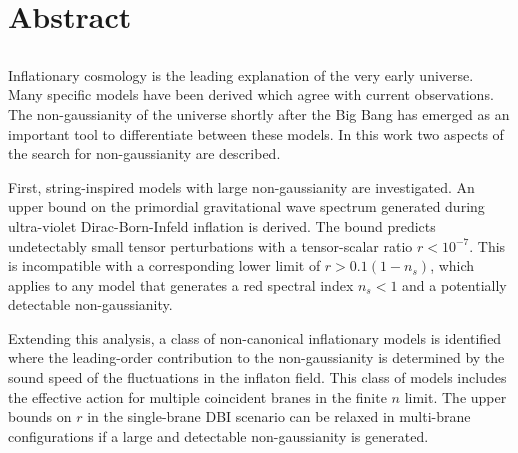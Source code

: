 \renewcommand{\CVSrevision}{\version$Id: abstract.tex,v 1.8 2009/08/15 17:26:13 ith Exp $}
% 
% 
\chapter*{Abstract}
\label{ch:abstract}
\section*{}
\singlespacing
Inflationary cosmology is the leading explanation of the very early universe. 
Many specific models have been derived which agree with current observations.
The non-gaussianity of the universe shortly after the Big Bang has emerged as
an important tool to differentiate between these models. In this work
two aspects of the search for non-gaussianity are described.

First, string-inspired models with large non-gaussianity are investigated.
An upper bound on the primordial gravitational wave spectrum
generated during ultra-violet Dirac-Born-Infeld inflation is derived. 
The bound predicts
undetectably small tensor perturbations with a tensor-scalar ratio $r <
10^{-7}$. 
This is incompatible with a corresponding lower limit of $r > 0.1
(1-n_s)$, which applies to any model that generates a red spectral index $n_s
<1$ and a potentially detectable non-gaussianity.

Extending this analysis, a class of non-canonical inflationary models is
identified where the leading-order contribution to the non-gaussianity is
determined by the sound speed of the fluctuations in
the inflaton field. 
This class of models includes the effective action for
multiple coincident branes in the finite $n$ limit. 
The upper bounds on $r$ in the single-brane
DBI scenario can be relaxed in multi-brane configurations if a large and
detectable non-gaussianity is generated. 

